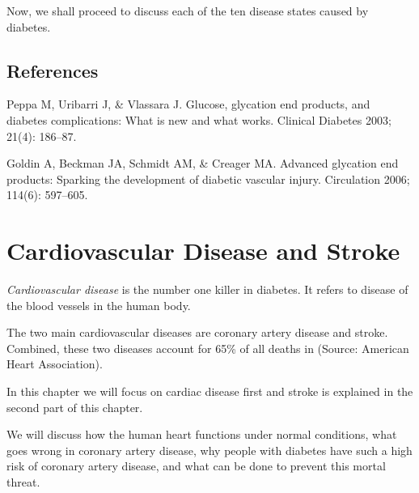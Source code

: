 {Now, we shall proceed to discuss each of the ten disease states caused by diabetes.

\section*{References}

\begin{thebibliography}{99}
 Peppa M, Uribarri J, \& Vlassara J. Glucose, glycation end products, and diabetes complications: What is new and what works. Clinical Diabetes 2003; 21(4): 186–87.

  Goldin A, Beckman JA, Schmidt AM, \& Creager MA. Advanced glycation end products: Sparking the development of diabetic vascular injury. Circulation 2006; 114(6): 597–605.

 \end{thebibliography}


\chapter{Cardiovascular Disease and Stroke}\label{chap12}

\textit{Cardiovascular disease} is the number one killer in diabetes. It refers to disease of the blood vessels in the human body. 

The two main cardiovascular diseases are coronary artery disease and stroke. Combined, these two diseases account for 65\% of all deaths in  (Source: American Heart Association). 

In this chapter we will focus on cardiac disease first and stroke is explained in the second part of this chapter.

We will discuss how the human heart functions under normal conditions, what goes wrong in coronary artery disease, why people with diabetes have such a high risk of coronary artery disease, and what can be done to prevent this mortal threat.

}
